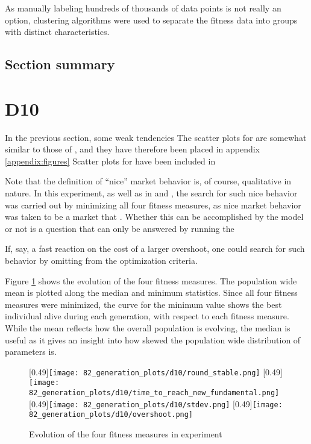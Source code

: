 As manually labeling hundreds of thousands of data points is not really an option, clustering algorithms were used to separate the fitness data into groups with distinct characteristics. 

\subsection{Section summary}


\section{D10}
In the previous section, some weak tendencies 
The scatter plots for \dten{} are somewhat similar to those of \dnine, and they have therefore been placed in appendix \ref{appendix:figures}
Scatter plots for \dten{} have been included in 





Note that the definition of ``nice'' market behavior is, of course, qualitative in nature. In this experiment, as well as in \dnine{} and \deleven, the search for such nice behavior was carried out by minimizing all four fitness measures, as nice market behavior was taken to be a market that . Whether this can be accomplished by the model or not is a question that can only be answered by running the 

If, say, a fast reaction on the cost of a larger overshoot, one could search for such behavior by omitting \overshoot{} from the optimization criteria.



Figure \ref{fig:d10_evolution_fitness} shows the evolution of the four fitness measures. The population wide mean is plotted along the median and minimum statistics. Since all four fitness measures were minimized, the curve for the minimum value shows the best individual alive during each generation, with respect to each fitness measure. While the mean reflects how the overall population is evolving,  the median is useful as it gives an insight into how skewed the population wide distribution of parameters is. 
\begin{figure}
	\centering
	[0.49\linewidth]{\texttt{[image: 82\_generation\_plots/d10/round\_stable.png]}}
	[0.49\linewidth]{\texttt{[image: 82\_generation\_plots/d10/time\_to\_reach\_new\_fundamental.png]}}
	[0.49\linewidth]{\texttt{[image: 82\_generation\_plots/d10/stdev.png]}}
	[0.49\linewidth]{\texttt{[image: 82\_generation\_plots/d10/overshoot.png]}}
	\caption{Evolution of the four fitness measures in experiment \dten}
	\label{fig:d10_evolution_fitness}
\end{figure}



